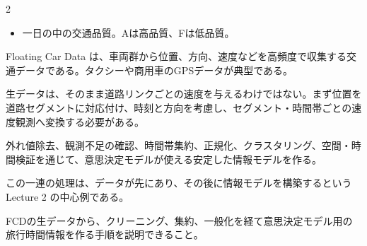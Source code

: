 \begin{multicols}{2}

\footnotesize

\raggedcolumns


\begin{itemize}
\item 一日の中の交通品質。Aは高品質、Fは低品質。
\end{itemize}

Floating Car Data は、車両群から位置、方向、速度などを高頻度で収集する交通データである。タクシーや商用車のGPSデータが典型である。\par

生データは、そのまま道路リンクごとの速度を与えるわけではない。まず位置を道路セグメントに対応付け、時刻と方向を考慮し、セグメント・時間帯ごとの速度観測へ変換する必要がある。\par

外れ値除去、観測不足の確認、時間帯集約、正規化、クラスタリング、空間・時間検証を通じて、意思決定モデルが使える安定した情報モデルを作る。\par

この一連の処理は、データが先にあり、その後に情報モデルを構築するという Lecture 2 の中心例である。\par

FCDの生データから、クリーニング、集約、一般化を経て意思決定モデル用の旅行時間情報を作る手順を説明できること。\par



\end{multicols}
